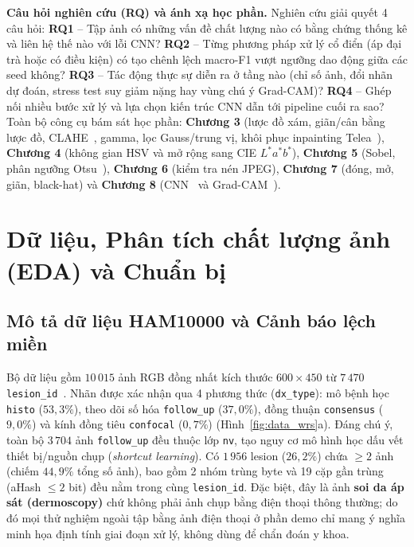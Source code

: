 \documentclass[10pt,twocolumn,a4paper]{article}
\begin{document}
\textbf{Câu hỏi nghiên cứu (RQ) và ánh xạ học phần.} Nghiên cứu giải quyết 4 câu hỏi: \textbf{RQ1} -- Tập ảnh có những vấn đề chất lượng nào có bằng chứng thống kê và liên hệ thế nào với lỗi CNN? \textbf{RQ2} -- Từng phương pháp xử lý cổ điển (áp đại trà hoặc có điều kiện) có tạo chênh lệch macro-F1 vượt ngưỡng dao động giữa các seed không? \textbf{RQ3} -- Tác động thực sự diễn ra ở tầng nào (chỉ số ảnh, đổi nhãn dự đoán, stress test suy giảm nặng hay vùng chú ý Grad-CAM)? \textbf{RQ4} -- Ghép nối nhiều bước xử lý và lựa chọn kiến trúc CNN dẫn tới pipeline cuối ra sao? Toàn bộ công cụ bám sát học phần: \textbf{Chương 3} (lược đồ xám, giãn/cân bằng lược đồ, CLAHE~\cite{zuiderveld1994clahe}, gamma, lọc Gauss/trung vị, khôi phục inpainting Telea~\cite{telea2004inpainting}), \textbf{Chương 4} (không gian HSV và mở rộng sang CIE $L^*a^*b^*$), \textbf{Chương 5} (Sobel, phân ngưỡng Otsu~\cite{otsu1979threshold}), \textbf{Chương 6} (kiểm tra nén JPEG), \textbf{Chương 7} (đóng, mở, giãn, black-hat) và \textbf{Chương 8} (CNN~\cite{he2016resnet,tan2019efficientnet,howard2019mobilenetv3} và Grad-CAM~\cite{selvaraju2017gradcam}).

\section{Dữ liệu, Phân tích chất lượng ảnh (EDA) và Chuẩn bị}
\subsection{Mô tả dữ liệu HAM10000 và Cảnh báo lệch miền}
Bộ dữ liệu gồm $10\,015$ ảnh RGB đồng nhất kích thước $600{\times}450$ từ $7\,470$ \texttt{lesion\_id}~\cite{tschandl2018ham10000}. Nhãn được xác nhận qua 4 phương thức (\texttt{dx\_type}): mô bệnh học \texttt{histo} ($53{,}3\%$), theo dõi số hóa \texttt{follow\_up} ($37{,}0\%$), đồng thuận \texttt{consensus} ($9{,}0\%$) và kính đồng tiêu \texttt{confocal} ($0{,}7\%$) (Hình~\ref{fig:data_wrs}a). Đáng chú ý, toàn bộ $3\,704$ ảnh \texttt{follow\_up} đều thuộc lớp \texttt{nv}, tạo nguy cơ mô hình học dấu vết thiết bị/nguồn chụp (\emph{shortcut learning}). Có $1\,956$ lesion ($26{,}2\%$) chứa $\ge 2$ ảnh (chiếm $44{,}9\%$ tổng số ảnh), bao gồm 2 nhóm trùng byte và 19 cặp gần trùng (aHash $\le 2$ bit) đều nằm trong cùng \texttt{lesion\_id}. Đặc biệt, đây là ảnh \textbf{soi da áp sát (dermoscopy)} chứ không phải ảnh chụp bằng điện thoại thông thường; do đó mọi thử nghiệm ngoài tập bằng ảnh điện thoại ở phần demo chỉ mang ý nghĩa minh họa định tính giai đoạn xử lý, không dùng để chẩn đoán y khoa.
\end{document}
